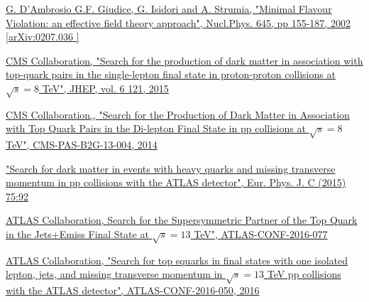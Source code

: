 \documentclass[a4paper, 10pt, openright]{report}
\begin{document}
\begin{thebibliography}{1}
\href{https://arxiv.org/abs/hep-ph/0207036}{G. D'Ambrosio G.F. Giudice, G. Isidori and A. Strumia,
"Minimal Flavour Violation: an effective field theory approach",
Nucl.Phys. 645, pp 155-187, 2002 [arXiv:0207.036 ]}



\href{https://arxiv.org/abs/1504.03198}{CMS Collaboration,
"Search for the production of dark matter in association with top-quark pairs in the single-lepton final state in proton-proton collisions at $\sqrt{s} = 8$ TeV",
JHEP, vol. 6 121, 2015}

\href{http://inspirehep.net/record/1292446}{CMS Collaboration,,
"Search for the Production of Dark Matter in Association with Top Quark Pairs in the Di-lepton Final State in pp collisions at $\sqrt{s} = 8$ TeV",
CMS-PAS-B2G-13-004, 2014}

\href{https://arxiv.org/abs/1410.4031}{
"Search for dark matter in events with heavy quarks and missing transverse momentum in pp collisions with the ATLAS detector",
Eur. Phys. J. C (2015) 75:92}


\href{http://inspirehep.net/record/1480057}{ATLAS Collaboration,
Search for the Supersymmetric Partner of the Top Quark in the Jets+Emiss Final State at $\sqrt{s} = 13$ TeV",
ATLAS-CONF-2016-077
}

\href{http://inspirehep.net/record/1480030/}{ATLAS Collaboration,
"Search for top squarks in final states with one isolated lepton, jets, and missing transverse momentum in $\sqrt{s} = 13$ TeV pp collisions with the ATLAS detector",
ATLAS-CONF-2016-050, 2016}


\end{thebibliography}
\end{document}
